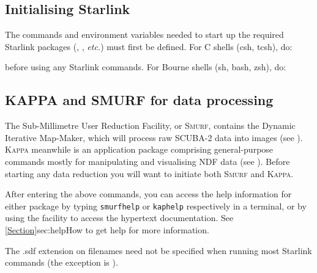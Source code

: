 \subsection{Initialising Starlink}
\label{sec:starinit}

The commands and environment variables needed to start up the required
Starlink packages (\smurf \cite{smurf}, \Kappa, \emph{etc.}) must first
be defined. For C shells (csh, tcsh), do:

\begin{terminalv}
\end{terminalv}

before using any Starlink commands. For Bourne shells (sh, bash, zsh), do:

\begin{terminalv}
\end{terminalv}

\subsection{KAPPA and SMURF for data processing}
\label{sec:packinit}

The Sub-Millimetre User Reduction Facility, or \textsc{Smurf},
contains the Dynamic Iterative Map-Maker, which will process raw
SCUBA-2 data into images (see \smurfsun). \textsc{Kappa} meanwhile is
an application package comprising general-purpose commands mostly for
manipulating and visualising NDF data (see \kappasun). Before starting
any data reduction you will want to initiate both \textsc{Smurf} and
\textsc{Kappa}.

\begin{terminalv}
\end{terminalv}

After entering the above commands, you can access the help information
for either package by typing \texttt{smurfhelp} or
\texttt{kaphelp} respectively in a terminal, or by using the
 facility to access the hypertext documentation. See
\cref{Section}{sec:help}{How to get help} for more information.



\begin{tip}
The .sdf extension on filenames need not be specified when running most
Starlink commands (the exception is \picard).
\end{tip}


